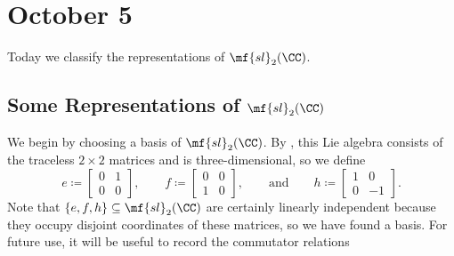 \documentclass[../notes.tex]{subfiles}
\begin{document}
\section{October 5}
Today we classify the representations of $\mf{sl}_2(\CC)$.

\subsection{Some Representations of \texorpdfstring{$\mf{sl}_2(\CC)$}{sl2(C)}}
%
We begin by choosing a basis of $\mf{sl}_2(\CC)$. By , this Lie algebra consists of the traceless $2\times2$ matrices and is three-dimensional, so we define
\[e\coloneqq\begin{bmatrix}
	0 & 1 \\ 0 & 0
\end{bmatrix},\qquad f\coloneqq\begin{bmatrix}
	0 & 0 \\
	1 & 0
\end{bmatrix},\qquad\text{and}\qquad h\coloneqq\begin{bmatrix}
	1 & 0 \\
	0 & -1
\end{bmatrix}.\]
Note that $\{e,f,h\}\subseteq\mf{sl}_2(\CC)$ are certainly linearly independent because they occupy disjoint coordinates of these matrices, so we have found a basis. For future use, it will be useful to record the commutator relations
\end{document}
